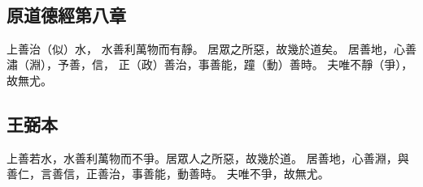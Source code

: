 ﻿%
%

\chapter{~}

\section{原道德經第八章}

\begin{withgezhu}

\zhsong


上善治（\textcolor{tongjia-color}{似}）水，
水善利萬物而有靜。
居眾之所惡，故幾於道矣。
居善地，心善潚（\textcolor{tongjia-color}{淵}），予善，信，
正（\textcolor{tongjia-color}{政}）善治，事善能，蹱（\textcolor{tongjia-color}{動}）善時。
夫唯不靜（\textcolor{tongjia-color}{爭}），故無尤。

\end{withgezhu}

\section{王弼本}

\begin{withgezhu}

\zhsong

上善若水，水善利萬物而不爭。居眾人之所惡，故幾於道。
居善地，心善淵，與善仁，言善信，正善治，事善能，動善時。
夫唯不爭，故無尤。

\end{withgezhu}

